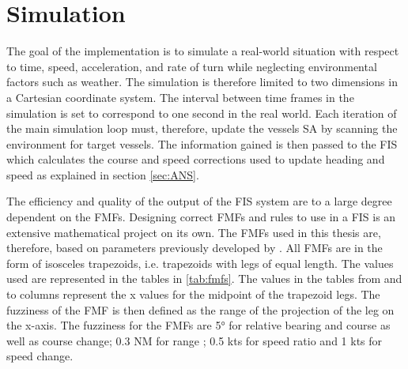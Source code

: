 \section{Simulation}
The goal of the implementation is to  simulate a real-world situation with respect to time, speed, acceleration, and rate of turn while neglecting  environmental factors such as weather.
The simulation is therefore limited to two dimensions in a Cartesian coordinate system.
The interval between time frames in the simulation is set to correspond to one second in the real world.
Each iteration of the main simulation loop must, therefore, update the vessels SA by scanning the environment for target vessels. The information gained is then passed to the FIS which calculates the course and speed corrections used to update heading and speed as explained in section \ref{sec:ANS}.

The efficiency and quality of the output of the FIS system are to a large degree dependent on the FMFs. Designing correct FMFs and rules to use in a FIS is an extensive mathematical project on its own. The FMFs used in this thesis are, therefore, based on parameters  previously developed by \textcite{perera2010smooth_param}. All FMFs are in the form of isosceles trapezoids, i.e. trapezoids with legs of equal length. The values used are represented in the tables in \ref{tab:fmfs}. The values in the tables from and to columns represent the x values for the midpoint of the trapezoid legs. The fuzziness of the FMF is then defined as the range of the projection of the leg on the x-axis. The fuzziness for the FMFs are \ang{5} for relative bearing and course as well as course change; 0.3 NM for range ; 0.5 kts for speed ratio and 1 kts for speed change.

